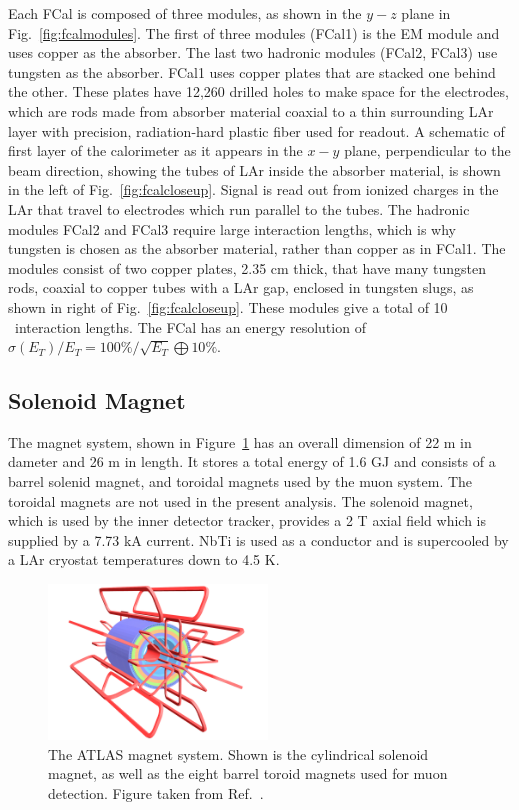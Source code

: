 {Each FCal is composed of three modules, as shown in the $y-z$ plane in Fig.~\ref{fig:fcalmodules}. The first of three modules (FCal1) is the EM module and uses copper as the absorber. The last two hadronic modules (FCal2, FCal3) use tungsten as the absorber. FCal1 uses copper plates that are stacked one behind the other. These plates have 12,260 drilled holes to make space for the electrodes, which are rods made from absorber material coaxial to a thin surrounding LAr layer with precision, radiation-hard plastic fiber used for readout.  A schematic of first layer of the calorimeter as it appears in the $x-y$ plane, perpendicular to the beam direction, showing the tubes of LAr inside the absorber material, is shown in the left of Fig.~\ref{fig:fcalcloseup}. Signal is read out from ionized charges in the LAr that travel to electrodes which run parallel to the tubes. The hadronic modules FCal2 and FCal3 require large interaction lengths, which is why tungsten is chosen as the absorber material, rather than copper as in FCal1. The modules consist of two copper plates, 2.35 cm thick, that have many tungsten rods, coaxial to copper tubes with a LAr gap, enclosed in tungsten slugs, as shown in right of Fig.~\ref{fig:fcalcloseup}. These modules give a total of 10 \intlen\ interaction lengths. The FCal has an energy resolution of $\sigma(E_{T})/E_{T}=100\%/\sqrt{E_{T}}\bigoplus10\%$. 

\subsection{Solenoid Magnet}
The magnet system, shown in Figure~\ref{fig:magnet} has an overall dimension of 22 m in dameter and 26 m in length. It stores a total energy of 1.6 GJ and consists of a barrel solenid magnet, and toroidal magnets used by the muon system. The toroidal magnets are not used in the present analysis. The solenoid magnet, which is used by the inner detector tracker, provides a 2 T axial field which is supplied by a 7.73 kA current. NbTi is used as a conductor and is supercooled by a LAr cryostat temperatures down to 4.5 K. 


\begin{figure}
	\centerline{
		\includegraphics[width=0.52\textwidth]{figures/magnet.pdf} %
	}
	\caption{ The ATLAS magnet system. Shown is the cylindrical solenoid magnet, as well as the eight barrel toroid magnets used for muon detection. Figure taken from Ref.~\cite{Aad:2008zzm}.}	
	\label{fig:magnet}
\end{figure}

}
